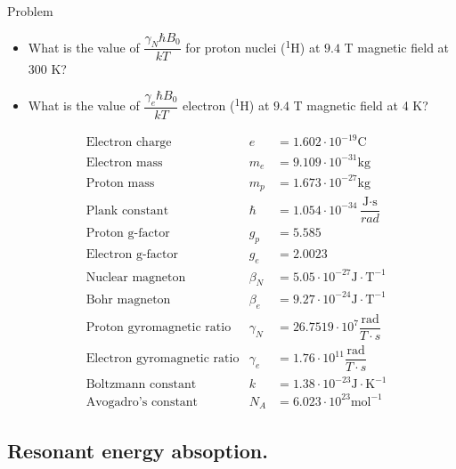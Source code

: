 \documentclass[handout]{beamer}
\begin{document}
\begin{frame}
	\begin{block}{Problem}
		\begin{itemize}
			\item What is the value of $\dfrac{\gamma_N \hbar B_0}{kT}$ for proton nuclei (\textsuperscript{1}H) at $9.4$ T magnetic field at 300 K?
			\item What is the value of $\dfrac{\gamma_e \hbar B_0}{kT}$ electron (\textsuperscript{1}H) at $9.4$ T magnetic field at 4 K?
		\end {itemize}      
	\end{block}
	{\tiny
	\begin{align*}
	&\text{Electron charge } &e &= 1.602 \cdot 10^{-19} \text{C}\\
	&\text{Electron mass } &m_e &= 9.109 \cdot 10^{-31} \text{kg} \\
	&\text{Proton mass}  &m_p &=  1.673 \cdot 10^{-27} \text{kg}  \\
	&\text{Plank constant}  &\hbar &=  1.054 \cdot 10^{-34} \dfrac{\text{J} \cdot \text{s}}{rad}  \\
	&\text{Proton g-factor}  &g_p &=  5.585 \\
	&\text{Electron g-factor}  &g_e &=  2.0023 \\
	&\text{Nuclear magneton}  &\beta_N &=  5.05 \cdot 10^{-27}  \text{J}\cdot \text{T}^{-1} \\
	&\text{Bohr magneton}  &\beta_e &=  9.27 \cdot 10^{-24}  \text{J}\cdot \text{T}^{-1} \\
	&\text{Proton gyromagnetic ratio}  &\gamma_N &=  26.7519 \cdot 10^{7} \dfrac{\text{rad}}{T \cdot s}\\
	&\text{Electron gyromagnetic ratio}  &\gamma_e &=  1.76 \cdot 10^{11} \dfrac{\text{rad}}{T \cdot s}\\
	&\text{Boltzmann constant}  &k &=  1.38 \cdot 10^{-23} {\text{J}} \cdot \text{K}^{-1}\\
	&\text{Avogadro's constant}  &N_A &=  6.023 \cdot 10^{23} \text{mol}^{-1}
	\end{align*}
    }%
\end{frame}
\subsection{Resonant energy absoption.}
\end{document}
